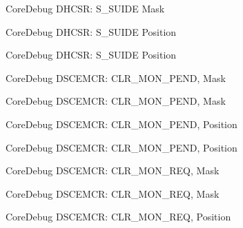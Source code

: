 \begin{DoxyRefList}
\label{deprecated__deprecated000467}%
%
Core\+Debug D\+H\+C\+SR\+: S\+\_\+\+S\+U\+I\+DE Mask  
\item[Member \mbox{\hyperlink{group__CMSIS__CoreDebug_gacff001d7e8c9665a1dc91018f2505d3d}{Core\+Debug\+\_\+\+D\+H\+C\+S\+R\+\_\+\+S\+\_\+\+S\+U\+I\+D\+E\+\_\+\+Pos}} ]\label{deprecated__deprecated000015}%
%
Core\+Debug D\+H\+C\+SR\+: S\+\_\+\+S\+U\+I\+DE Position 

\label{deprecated__deprecated000466}%
%
Core\+Debug D\+H\+C\+SR\+: S\+\_\+\+S\+U\+I\+DE Position  
\item[Member \mbox{\hyperlink{group__CMSIS__CoreDebug_gacfb17801664286ab627a094d5fb3da20}{Core\+Debug\+\_\+\+D\+S\+C\+E\+M\+C\+R\+\_\+\+C\+L\+R\+\_\+\+M\+O\+N\+\_\+\+P\+E\+N\+D\+\_\+\+Msk}} ]\label{deprecated__deprecated000074}%
%
Core\+Debug D\+S\+C\+E\+M\+CR\+: C\+L\+R\+\_\+\+M\+O\+N\+\_\+\+P\+E\+ND, Mask 

\label{deprecated__deprecated000525}%
%
Core\+Debug D\+S\+C\+E\+M\+CR\+: C\+L\+R\+\_\+\+M\+O\+N\+\_\+\+P\+E\+ND, Mask  
\item[Member \mbox{\hyperlink{group__CMSIS__CoreDebug_ga2295235d9c595bd6f287728f4c395bbf}{Core\+Debug\+\_\+\+D\+S\+C\+E\+M\+C\+R\+\_\+\+C\+L\+R\+\_\+\+M\+O\+N\+\_\+\+P\+E\+N\+D\+\_\+\+Pos}} ]\label{deprecated__deprecated000073}%
%
Core\+Debug D\+S\+C\+E\+M\+CR\+: C\+L\+R\+\_\+\+M\+O\+N\+\_\+\+P\+E\+ND, Position 

\label{deprecated__deprecated000524}%
%
Core\+Debug D\+S\+C\+E\+M\+CR\+: C\+L\+R\+\_\+\+M\+O\+N\+\_\+\+P\+E\+ND, Position  
\item[Member \mbox{\hyperlink{group__CMSIS__CoreDebug_gaea36b8cede2cc1184176eb20b7bd0f8d}{Core\+Debug\+\_\+\+D\+S\+C\+E\+M\+C\+R\+\_\+\+C\+L\+R\+\_\+\+M\+O\+N\+\_\+\+R\+E\+Q\+\_\+\+Msk}} ]\label{deprecated__deprecated000072}%
%
Core\+Debug D\+S\+C\+E\+M\+CR\+: C\+L\+R\+\_\+\+M\+O\+N\+\_\+\+R\+EQ, Mask 

\label{deprecated__deprecated000523}%
%
Core\+Debug D\+S\+C\+E\+M\+CR\+: C\+L\+R\+\_\+\+M\+O\+N\+\_\+\+R\+EQ, Mask  
\item[Member \mbox{\hyperlink{group__CMSIS__CoreDebug_ga1e2e3a310143f4663f1c415c03c3d535}{Core\+Debug\+\_\+\+D\+S\+C\+E\+M\+C\+R\+\_\+\+C\+L\+R\+\_\+\+M\+O\+N\+\_\+\+R\+E\+Q\+\_\+\+Pos}} ]\label{deprecated__deprecated000071}%
%
Core\+Debug D\+S\+C\+E\+M\+CR\+: C\+L\+R\+\_\+\+M\+O\+N\+\_\+\+R\+EQ, Position 


\end{DoxyRefList}
